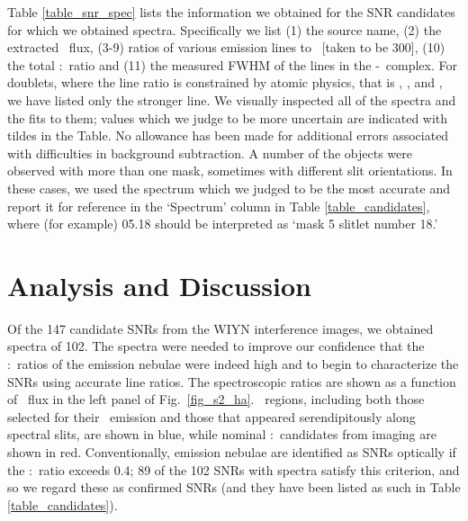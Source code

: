Table \ref{table_snr_spec}  lists the information we obtained for the SNR candidates for which we obtained spectra.  Specifically we list (1) the source name, (2) the extracted  \ha\ flux, (3-9) ratios of various emission lines to \ha\ [taken to be 300], (10) the total \sii:\ha\ ratio and (11) the measured FWHM of the lines in the \ha-\nii\ complex.  For doublets, where the line ratio is constrained by atomic physics, that is \oiii, \oi, and \nii, we have listed only the stronger line.  We visually inspected all of the spectra and the fits to them; values which we judge to be more uncertain are indicated with tildes in the Table.  No allowance has been made for additional errors associated with difficulties in background subtraction.  A number of the objects were observed with more than one mask, sometimes with different slit orientations.  In these cases, we used the spectrum which we judged to be the most accurate and report it for reference in the `Spectrum' column in Table \ref{table_candidates}, where (for example) 05.18 should be interpreted as `mask 5 slitlet number 18.'


\section{Analysis and Discussion}

Of the 147 candidate SNRs from the WIYN interference images, we obtained spectra of 102. The spectra were needed to improve our confidence that the \sii:\ha\ ratios of the emission nebulae were indeed high and to begin to characterize the SNRs using accurate line ratios.  The spectroscopic ratios are shown as a function of \ha\ flux in the left panel of  Fig.\ \ref{fig_s2_ha}. \hii\ regions, including both those selected for their \oiii\ emission and those that appeared serendipitously along spectral slits, are shown in blue, while nominal \sii:\ha\ candidates from imaging are shown in red.   Conventionally, emission nebulae are identified as SNRs optically if the \sii:\ha\ ratio exceeds 0.4; 89 of the 102 SNRs with spectra satisfy this criterion, and so we regard these as confirmed SNRs (and they have been listed as such in Table \ref{table_candidates}). 

